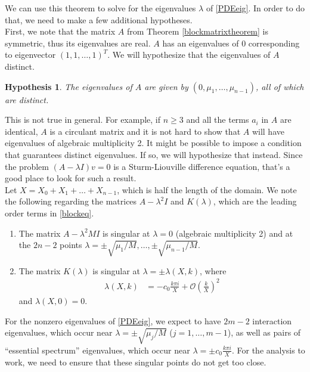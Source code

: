 \documentclass[12pt]{article}
\newtheorem{hypothesis}{Hypothesis}
\begin{document}
We can use this theorem to solve for the eigenvalues $\lambda$ of \eqref{PDEeig}. In order to do that, we need to make a few additional hypotheses.\\

First, we note that the matrix $A$ from Theorem \ref{blockmatrixtheorem} is symmetric, thus its eigenvalues are real. $A$ has an eigenvalues of 0 corresponding to eigenvector $(1, 1, \dots, 1)^T$. We will hypothesize that the eigenvalues of $A$ distinct. 

\begin{hypothesis}\label{eigAdistinct}
The eigenvalues of $A$ are given by $(0, \mu_1, \dots, \mu_{n-1})$, all of which are distinct.
\end{hypothesis}

This is not true in general. For example, if $n \geq 3$ and all the terms $a_i$ in $A$ are identical, $A$ is a circulant matrix and it is not hard to show that $A$ will have eigenvalues of algebraic multiplicity 2. It might be possible to impose a condition that guarantees distinct eigenvalues. If so, we will hypothesize that instead. Since the problem $(A - \lambda I)v = 0$ is a Sturm-Liouville difference equation, that's a good place to look for such a result.\\

Let $X = X_0 + X_1 + \dots + X_{n-1}$, which is half the length of the domain. We note the following regarding the matrices $A - \lambda^2 I$ and $K(\lambda)$, which are the leading order terms in \eqref{blockeq}.

\begin{enumerate}
	\item The matrix $A - \lambda^2 M I$ is singular at $\lambda = 0$ (algebraic multiplicity 2) and at the $2n-2$ points $\lambda = \pm \sqrt{\mu_1/M}, \dots, \pm \sqrt{\mu_{n-1}/M}$.

	\item The matrix $K(\lambda)$ is singular at $\lambda = \pm \lambda(X,k)$, where
	\begin{align}\label{lambdaXk}
	\lambda(X,k)
		&= -c_0 \frac{k \pi i }{X} + \mathcal{O}\left(\frac{k}{X}\right)^2 
	\end{align} 
	and $\lambda(X, 0) = 0$.
\end{enumerate}  

For the nonzero eigenvalues of \eqref{PDEeig}, we expect to have $2m-2$ interaction eigenvalues, which occur near $\lambda = \pm \sqrt{\mu_j/M}$ ($j = 1, \dots, m-1$), as well as pairs of ``essential spectrum'' eigenvalues, which occur near $\lambda = \pm c_0 \frac{k \pi i }{X}$. For the analysis to work, we need to ensure that these singular points do not get too close.\\
\end{document}
